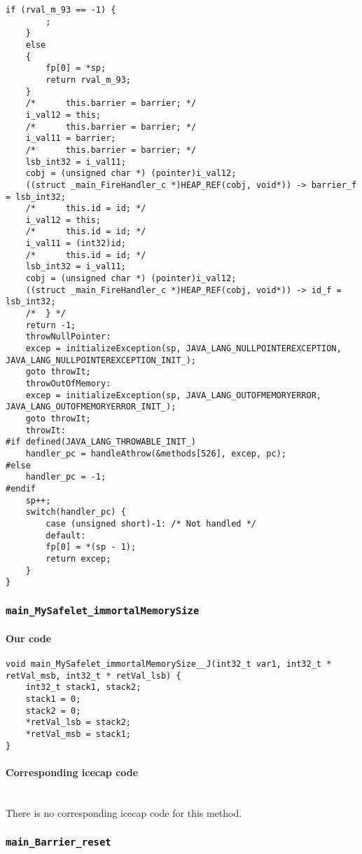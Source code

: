 \begin{lstlisting}[firstnumber=54903]
	if (rval_m_93 == -1) {
		;
	}
	else
	{
		fp[0] = *sp;
		return rval_m_93;
	}
	/*		this.barrier = barrier; */
	i_val12 = this;
	/*		this.barrier = barrier; */
	i_val11 = barrier;
	/*		this.barrier = barrier; */
	lsb_int32 = i_val11;
	cobj = (unsigned char *) (pointer)i_val12;
	((struct _main_FireHandler_c *)HEAP_REF(cobj, void*)) -> barrier_f = lsb_int32;
	/*		this.id = id; */
	i_val12 = this;
	/*		this.id = id; */
	i_val11 = (int32)id;
	/*		this.id = id; */
	lsb_int32 = i_val11;
	cobj = (unsigned char *) (pointer)i_val12;
	((struct _main_FireHandler_c *)HEAP_REF(cobj, void*)) -> id_f = lsb_int32;
	/*	} */
	return -1;
	throwNullPointer:
	excep = initializeException(sp, JAVA_LANG_NULLPOINTEREXCEPTION, JAVA_LANG_NULLPOINTEREXCEPTION_INIT_);
	goto throwIt;
	throwOutOfMemory:
	excep = initializeException(sp, JAVA_LANG_OUTOFMEMORYERROR, JAVA_LANG_OUTOFMEMORYERROR_INIT_);
	goto throwIt;
	throwIt:
#if defined(JAVA_LANG_THROWABLE_INIT_)
	handler_pc = handleAthrow(&methods[526], excep, pc);
#else
	handler_pc = -1;
#endif
	sp++;
	switch(handler_pc) {
		case (unsigned short)-1: /* Not handled */
		default:
		fp[0] = *(sp - 1);
		return excep;
	}
}
\end{lstlisting}


\subsubsection{\texttt{main\_MySafelet\_immortalMemorySize}}

\paragraph{Our code}\hfill
\begin{lstlisting}[firstnumber=2354]
void main_MySafelet_immortalMemorySize__J(int32_t var1, int32_t * retVal_msb, int32_t * retVal_lsb) {
	int32_t stack1, stack2;
	stack1 = 0;
	stack2 = 0;
	*retVal_lsb = stack2;
	*retVal_msb = stack1;
}
\end{lstlisting}

\paragraph{Corresponding icecap code}\hfill\\
There is no corresponding icecap code for this method.


\subsubsection{\texttt{main\_Barrier\_reset}}

